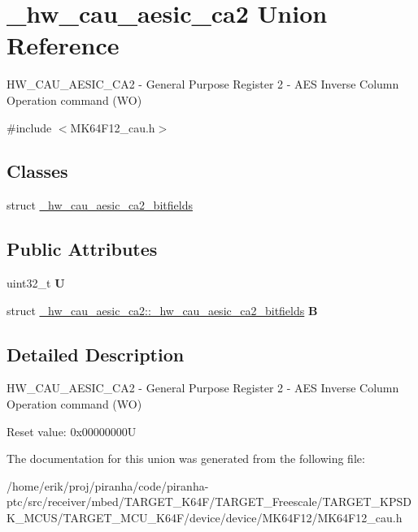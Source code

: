\hypertarget{union__hw__cau__aesic__ca2}{}\section{\+\_\+hw\+\_\+cau\+\_\+aesic\+\_\+ca2 Union Reference}
\label{union__hw__cau__aesic__ca2}


H\+W\+\_\+\+C\+A\+U\+\_\+\+A\+E\+S\+I\+C\+\_\+\+C\+A2 -\/ General Purpose Register 2 -\/ A\+ES Inverse Column Operation command (WO)  




{\ttfamily \#include $<$M\+K64\+F12\+\_\+cau.\+h$>$}

\subsection*{Classes}
\begin{DoxyCompactItemize}
\item 
struct \hyperlink{struct__hw__cau__aesic__ca2_1_1__hw__cau__aesic__ca2__bitfields}{\+\_\+hw\+\_\+cau\+\_\+aesic\+\_\+ca2\+\_\+bitfields}
\end{DoxyCompactItemize}
\subsection*{Public Attributes}
\begin{DoxyCompactItemize}
\item 
uint32\+\_\+t {\bfseries U}\hypertarget{union__hw__cau__aesic__ca2_acdb2b7f009e505163b3d4c5bf0d1a07f}{}\label{union__hw__cau__aesic__ca2_acdb2b7f009e505163b3d4c5bf0d1a07f}

\item 
struct \hyperlink{struct__hw__cau__aesic__ca2_1_1__hw__cau__aesic__ca2__bitfields}{\+\_\+hw\+\_\+cau\+\_\+aesic\+\_\+ca2\+::\+\_\+hw\+\_\+cau\+\_\+aesic\+\_\+ca2\+\_\+bitfields} {\bfseries B}\hypertarget{union__hw__cau__aesic__ca2_a495b692c6d0995b5fb47a3711d800855}{}\label{union__hw__cau__aesic__ca2_a495b692c6d0995b5fb47a3711d800855}

\end{DoxyCompactItemize}


\subsection{Detailed Description}
H\+W\+\_\+\+C\+A\+U\+\_\+\+A\+E\+S\+I\+C\+\_\+\+C\+A2 -\/ General Purpose Register 2 -\/ A\+ES Inverse Column Operation command (WO) 

Reset value\+: 0x00000000U 

The documentation for this union was generated from the following file\+:\begin{DoxyCompactItemize}
\item 
/home/erik/proj/piranha/code/piranha-\/ptc/src/receiver/mbed/\+T\+A\+R\+G\+E\+T\+\_\+\+K64\+F/\+T\+A\+R\+G\+E\+T\+\_\+\+Freescale/\+T\+A\+R\+G\+E\+T\+\_\+\+K\+P\+S\+D\+K\+\_\+\+M\+C\+U\+S/\+T\+A\+R\+G\+E\+T\+\_\+\+M\+C\+U\+\_\+\+K64\+F/device/device/\+M\+K64\+F12/M\+K64\+F12\+\_\+cau.\+h\end{DoxyCompactItemize}
